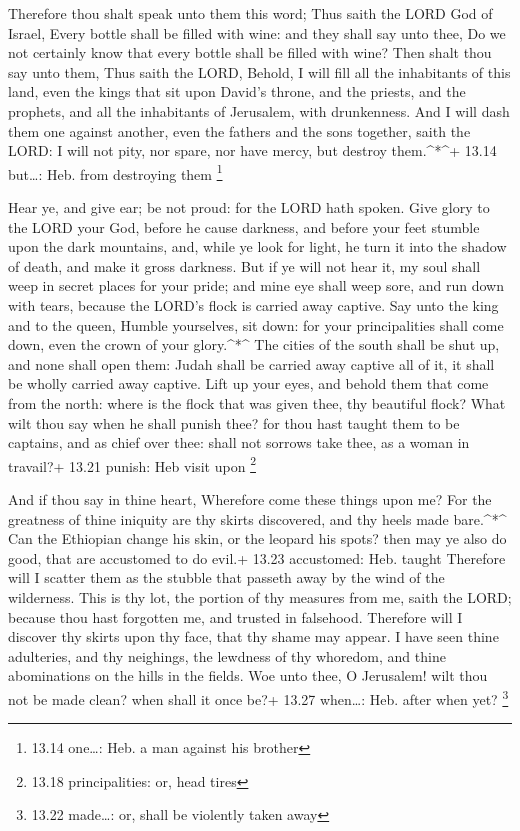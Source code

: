  Therefore thou shalt speak unto them this word; Thus saith
the LORD God of Israel, Every bottle shall be filled with wine: and they
shall say unto thee, Do we not certainly know that every bottle shall be
filled with wine?  Then shalt thou say unto them, Thus
saith the LORD, Behold, I will fill all the inhabitants of this land,
even the kings that sit upon David's throne, and the priests, and the
prophets, and all the inhabitants of Jerusalem, with drunkenness.
 And I will dash them one against another, even the fathers
and the sons together, saith the LORD: I will not pity, nor spare, nor
have mercy, but destroy them.\^{}*\^{}+ 13.14 but\ldots: Heb. from
destroying them \footnote{13.14 one\ldots: Heb. a man against his
  brother}

 Hear ye, and give ear; be not proud: for the LORD hath
spoken.  Give glory to the LORD your God, before he cause
darkness, and before your feet stumble upon the dark mountains, and,
while ye look for light, he turn it into the shadow of death, and make
it gross darkness.  But if ye will not hear it, my soul
shall weep in secret places for your pride; and mine eye shall weep
sore, and run down with tears, because the LORD's flock is carried away
captive.  Say unto the king and to the queen, Humble
yourselves, sit down: for your principalities shall come down, even the
crown of your glory.\^{}*\^{}  The cities of the south
shall be shut up, and none shall open them: Judah shall be carried away
captive all of it, it shall be wholly carried away captive.
 Lift up your eyes, and behold them that come from the
north: where is the flock that was given thee, thy beautiful flock?
 What wilt thou say when he shall punish thee? for thou
hast taught them to be captains, and as chief over thee: shall not
sorrows take thee, as a woman in travail?+ 13.21 punish: Heb visit upon
\footnote{13.18 principalities: or, head tires}

 And if thou say in thine heart, Wherefore come these
things upon me? For the greatness of thine iniquity are thy skirts
discovered, and thy heels made bare.\^{}*\^{}  Can the
Ethiopian change his skin, or the leopard his spots? then may ye also do
good, that are accustomed to do evil.+ 13.23 accustomed: Heb. taught
 Therefore will I scatter them as the stubble that passeth
away by the wind of the wilderness.  This is thy lot, the
portion of thy measures from me, saith the LORD; because thou hast
forgotten me, and trusted in falsehood.  Therefore will I
discover thy skirts upon thy face, that thy shame may appear.
 I have seen thine adulteries, and thy neighings, the
lewdness of thy whoredom, and thine abominations on the hills in the
fields. Woe unto thee, O Jerusalem! wilt thou not be made clean? when
shall it once be?+ 13.27 when\ldots: Heb. after when yet? \footnote{13.22
  made\ldots: or, shall be violently taken away}

